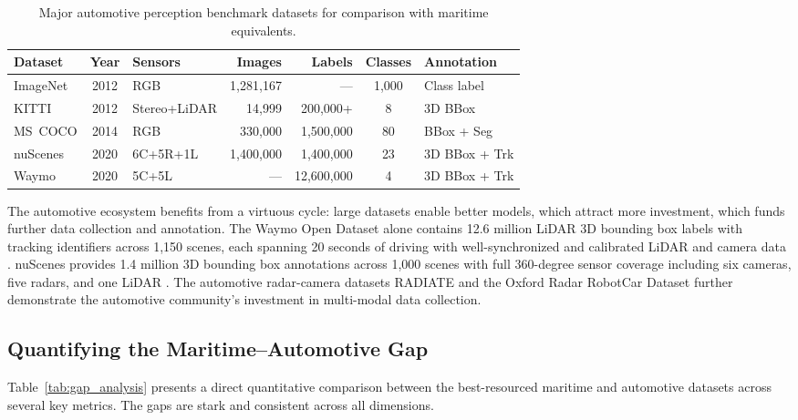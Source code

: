 \begin{table}[!htbp]
\centering
\caption{Major automotive perception benchmark datasets for comparison with maritime
equivalents.}
\label{tab:automotive_datasets}
\small
\begin{tabularx}{\textwidth}{@{}l c l r r c X@{}}
\toprule
\textbf{Dataset} & \textbf{Year} & \textbf{Sensors} & \textbf{Images} & \textbf{Labels} & \textbf{Classes} & \textbf{Annotation} \\
\midrule
ImageNet \cite{Russakovsky2015ImageNet}  & 2012 & RGB          & 1,281,167 &  ---           & 1,000 & Class label \\
KITTI \cite{Geiger2012KITTI}             & 2012 & Stereo+LiDAR &    14,999 &  200,000+      & 8     & 3D BBox \\
MS~COCO \cite{Lin2014COCO}              & 2014 & RGB          &   330,000 &  1,500,000     & 80    & BBox + Seg \\
nuScenes \cite{Caesar2020nuScenes}       & 2020 & 6C+5R+1L     & 1,400,000 &  1,400,000     & 23    & 3D BBox + Trk \\
Waymo \cite{Sun2020Waymo}                & 2020 & 5C+5L        & ---       &  12,600,000    & 4     & 3D BBox + Trk \\
\bottomrule
\end{tabularx}
\end{table}

The automotive ecosystem benefits from a virtuous cycle: large datasets enable better
models, which attract more investment, which funds further data collection and annotation.
The Waymo Open Dataset alone contains 12.6 million LiDAR 3D bounding box labels with
tracking identifiers across 1,150 scenes, each spanning 20 seconds of driving with
well-synchronized and calibrated LiDAR and camera data \cite{Sun2020Waymo}. nuScenes
provides 1.4 million 3D bounding box annotations across 1,000 scenes with full
360-degree sensor coverage including six cameras, five radars, and one LiDAR
\cite{Caesar2020nuScenes}. The automotive radar-camera datasets RADIATE
\cite{sheeny2020radiate} and the Oxford Radar RobotCar Dataset \cite{barnes2020oxford}
further demonstrate the automotive community's investment in multi-modal data collection.

\subsection{Quantifying the Maritime--Automotive Gap}
\label{subsec:gap_analysis}

Table~\ref{tab:gap_analysis} presents a direct quantitative comparison between the
best-resourced maritime and automotive datasets across several key metrics. The gaps are
stark and consistent across all dimensions.

